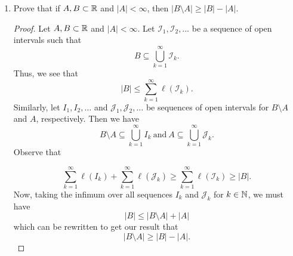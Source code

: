 \documentclass[11pt,a4paper]{book}
\begin{document}
\begin{enumerate}
\begin{proof}
        Now, let \( \epsilon > 0  \). Then we have
        \[  \sum_{ k=1  }^{ \infty   } \ell(t {I}_{k }) \leq | t A  |  + \epsilon.  \]
        By (1), we get that
        \[  \sum_{ k=1  }^{ \infty  } \ell(t {I}_{k }) = | t  |  \sum_{ k=1  }^{ \infty  } \ell({I}_{k })  \geq | t  |  | A  |.  \]
        Since \( \epsilon > 0  \) is arbitrary, we must have \( | t  |  | A  |  \leq | t A  |  \). Thus, we conclude that \( | t A  |  = | t  |  | A  |  \).


        \end{proof}
    \item Prove that if \( A, B \subset \mathbb{R}  \) and \( | A  | < \infty    \), then \( | B \setminus A  |  \geq | B  |  - | A  |  \).
        \begin{proof}
            Let \( A, B \subset \mathbb{R}  \) and \(  | A  |  < \infty  \). Let \( {\mathcal{I}}_{1}, {\mathcal{I}}_{2}, \dots  \) be a sequence of open intervals such that
            \[ B \subseteq \bigcup_{ k=1  }^{ \infty  }  {\mathcal{I}}_{k }.  \]
            Thus, we see that 
            \[  | B  |  \leq \sum_{ k=1  }^{ \infty  } \ell({\mathcal{I}}_{k }). \]
            Similarly, let \( {I}_{1}, {I}_{2}, \dots  \) and \( {\mathcal{J}}_{1}, {\mathcal{J}}_{2}, \dots  \) be sequences of open intervals for \( B \setminus A  \) and \(  A  \), respectively. Then
            we have 
            \[  B \setminus A \subseteq \bigcup_{ k=1  }^{ \infty  } {I}_{k} \ \text{and} \ A \subseteq  \bigcup_{ k=1  }^{ \infty  } {\mathcal{J}}_{k }.   \]
            Observe that

            \[  \sum_{ k=1  }^{ \infty  } \ell({I}_{k }) + \sum_{ k=1  }^{ \infty  } \ell({\mathcal{J}}_{k }) \geq \sum_{ k=1  }^{ \infty  } \ell({\mathcal{I}}_{k }) \geq | B  |. \]
            Now, taking the infimum over all sequences \( {I}_{k }  \) and \( {\mathcal{J}}_{k } \) for \( k \in \mathbb{N}  \), we must have 
            \[  | B  |  \leq | B \setminus A  |  + | A  |  \]
            which can be rewritten to get our result that
            \[  | B \setminus A | \geq | B  |  - | A  |.   \]
        \end{proof}
\end{enumerate}
\end{document}
